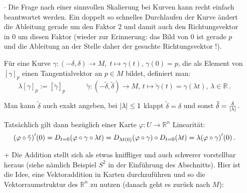 \documentclass[../H_Analysis_main.tex]{subfiles}
\begin{document}
\begin{itemize}
\item[$\cdot$] Die Frage nach einer sinnvollen Skalierung bei Kurven kann recht einfach beantwortet werden. Ein doppelt so schnelles Durchlaufen der Kurve ändert die Ableitung gerade um den Faktor 2 und damit auch den Richtungsvektor in 0 um diesen Faktor (wieder zur Erinnerung: das Bild von 0 ist gerade $p$ und die Ableitung an der Stelle daher der gesuchte Richtungsvektor !).

\begin{defi}[Skalarmultiplikation]
Für eine Kurve $\gamma: (-\delta, \delta) \rightarrow M, \; t \mapsto \gamma(t), \, \gamma(0) = p$, die als Element von $[\gamma]_p$ einen Tangentialvektor an $p \in M$ bildet, definiert man:
\begin{equation}
\lambda [\gamma]_p := [\tilde{\gamma}]_p \qquad \quad \tilde{\gamma}: (-\tilde{\delta}, \tilde{\delta}) \rightarrow M, \, t \mapsto \tilde{\gamma}(t) = \gamma(\lambda t), \, \lambda \in \mathbb{R} \, .
\end{equation}

Man kann $\tilde{\delta}$ auch exakt angeben, bei $\abs{\lambda} \leq 1$ klappt $\tilde{\delta} = \delta$ und sonst $\tilde{\delta} = \frac{\delta}{\abs{\lambda}}$.
\end{defi}

Tatsächlich gilt dann bezüglich einer Karte $\varphi: U \rightarrow \mathbb{R}^n$ Linearität:
\begin{equation*}
\qty(\varphi \circ \tilde{\gamma})'(0) = D_{t = 0} \qty(\varphi \circ \gamma \circ \lambda t) = D_{\lambda t(0)}\qty(\varphi \circ \gamma) \circ D_{t = 0} \qty(\lambda t) = \lambda \qty(\varphi \circ \gamma)'(0) \, .
\end{equation*}


\item[$+$] Die Addition stellt sich als etwas kniffliger und auch schwerer vorstellbar heraus (siehe nämlich Beispiel $S^2$ in der Einführung des Abschnitts). Hier ist die Idee, eine Vektoraddition in Karten durchzuführen und so die Vektorraumstruktur des $\mathbb{R}^n$ zu nutzen (danach geht es zurück nach $M$):


\end{itemize}
\end{document}
